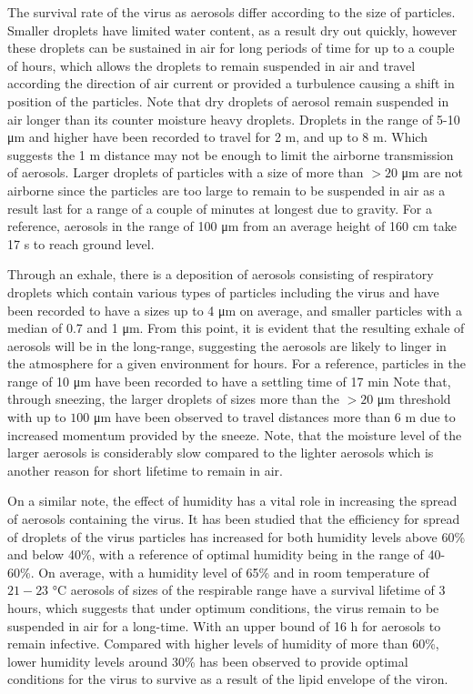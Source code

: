 \documentclass[11pt]{report}
\begin{document}
The survival rate of the virus as aerosols differ according to the size of particles. Smaller droplets have limited water content, as a result dry out quickly, however these droplets can be sustained in air for long periods of time for up to a couple of hours, which allows the droplets to remain suspended in air and travel according the direction of air current or provided a turbulence causing a shift in position of the particles. Note that dry droplets of aerosol remain suspended in air longer than its counter moisture heavy droplets. Droplets in the range of 5-10  \si{\micro\meter} and higher have been recorded to travel for 2 \si{\meter}, and up to 8 \si{\meter}. Which suggests the 1 \si{\meter} distance may not be enough to limit the airborne transmission of aerosols. Larger droplets of particles with a size of more than $>20$ \si{\micro\meter} are not airborne since the particles are too large to remain to be suspended in air as a result last for a range of a couple of minutes at longest due to gravity. For a reference, aerosols in the range of 100 \si{\micro\meter} from an average height of 160 \si{\centi\meter} take 17 \si{\second} to reach ground level.

Through an exhale, there is a deposition of aerosols consisting of respiratory droplets which contain various types of particles including the virus and have been recorded to have a sizes up to 4 \si{\micro\meter} on average, and smaller particles with a median of 0.7 and 1 \si{\micro\meter}. From this point, it is evident that the resulting exhale of aerosols will be in the long-range, suggesting the aerosols are likely to linger in the atmosphere for a given environment for hours. For a reference, particles in the range of 10  \si{\micro\meter} have been recorded to have a settling time of 17 \si{\minute} Note that, through sneezing, the larger droplets of sizes more than the $>20$ \si{\micro\meter} threshold with up to $100$ \si{\micro\meter} have been observed to travel distances more than 6 \si{\meter} due to increased momentum provided by the sneeze. Note, that the moisture level of the larger aerosols is considerably slow compared to the lighter aerosols which is another reason for short lifetime to remain in air. 

On a similar note, the effect of humidity has a vital role in increasing the spread of aerosols containing the virus. It has been studied that the efficiency for spread of droplets of the virus particles has increased for both humidity levels above 60\% and below 40\%, with a reference of optimal humidity being in the range of 40-60\%. On average, with a humidity level of 65\% and in room temperature of $21-23$ \si{\celsius} aerosols of sizes of the respirable range have a survival lifetime of 3 hours, which suggests that under optimum conditions, the virus remain to be suspended in air for a long-time.  With an upper bound of 16 \si{\hour} for aerosols to remain infective. Compared with higher levels of humidity of more than 60\%, lower humidity levels around 30\% has been observed to provide optimal conditions for the virus to survive as a result of the lipid envelope of the viron.  
\end{document}
